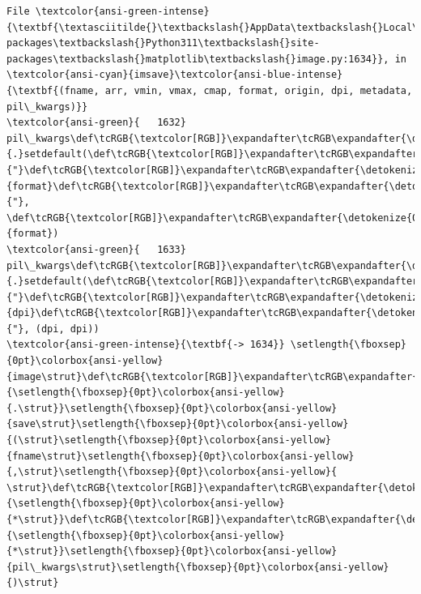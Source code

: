\documentclass[11pt]{article}
\begin{document}
\begin{Verbatim}[commandchars=\\\{\}, frame=single, framerule=2mm, rulecolor=\color{outerrorbackground}]
File \textcolor{ansi-green-intense}{\textbf{\textasciitilde{}\textbackslash{}AppData\textbackslash{}Local\textbackslash{}Packages\textbackslash{}PythonSoftwareFoundation.Python.3.11\_qbz5n2kfra8p0\textbackslash{}LocalCache\textbackslash{}local-packages\textbackslash{}Python311\textbackslash{}site-packages\textbackslash{}matplotlib\textbackslash{}image.py:1634}}, in \textcolor{ansi-cyan}{imsave}\textcolor{ansi-blue-intense}{\textbf{(fname, arr, vmin, vmax, cmap, format, origin, dpi, metadata, pil\_kwargs)}}
\textcolor{ansi-green}{   1632} pil\_kwargs\def\tcRGB{\textcolor[RGB]}\expandafter\tcRGB\expandafter{\detokenize{98,98,98}}{.}setdefault(\def\tcRGB{\textcolor[RGB]}\expandafter\tcRGB\expandafter{\detokenize{175,0,0}}{"}\def\tcRGB{\textcolor[RGB]}\expandafter\tcRGB\expandafter{\detokenize{175,0,0}}{format}\def\tcRGB{\textcolor[RGB]}\expandafter\tcRGB\expandafter{\detokenize{175,0,0}}{"}, \def\tcRGB{\textcolor[RGB]}\expandafter\tcRGB\expandafter{\detokenize{0,135,0}}{format})
\textcolor{ansi-green}{   1633} pil\_kwargs\def\tcRGB{\textcolor[RGB]}\expandafter\tcRGB\expandafter{\detokenize{98,98,98}}{.}setdefault(\def\tcRGB{\textcolor[RGB]}\expandafter\tcRGB\expandafter{\detokenize{175,0,0}}{"}\def\tcRGB{\textcolor[RGB]}\expandafter\tcRGB\expandafter{\detokenize{175,0,0}}{dpi}\def\tcRGB{\textcolor[RGB]}\expandafter\tcRGB\expandafter{\detokenize{175,0,0}}{"}, (dpi, dpi))
\textcolor{ansi-green-intense}{\textbf{-> 1634}} \setlength{\fboxsep}{0pt}\colorbox{ansi-yellow}{image\strut}\def\tcRGB{\textcolor[RGB]}\expandafter\tcRGB\expandafter{\detokenize{98,98,98}}{\setlength{\fboxsep}{0pt}\colorbox{ansi-yellow}{.\strut}}\setlength{\fboxsep}{0pt}\colorbox{ansi-yellow}{save\strut}\setlength{\fboxsep}{0pt}\colorbox{ansi-yellow}{(\strut}\setlength{\fboxsep}{0pt}\colorbox{ansi-yellow}{fname\strut}\setlength{\fboxsep}{0pt}\colorbox{ansi-yellow}{,\strut}\setlength{\fboxsep}{0pt}\colorbox{ansi-yellow}{ \strut}\def\tcRGB{\textcolor[RGB]}\expandafter\tcRGB\expandafter{\detokenize{98,98,98}}{\setlength{\fboxsep}{0pt}\colorbox{ansi-yellow}{*\strut}}\def\tcRGB{\textcolor[RGB]}\expandafter\tcRGB\expandafter{\detokenize{98,98,98}}{\setlength{\fboxsep}{0pt}\colorbox{ansi-yellow}{*\strut}}\setlength{\fboxsep}{0pt}\colorbox{ansi-yellow}{pil\_kwargs\strut}\setlength{\fboxsep}{0pt}\colorbox{ansi-yellow}{)\strut}


\end{Verbatim}
\end{document}
